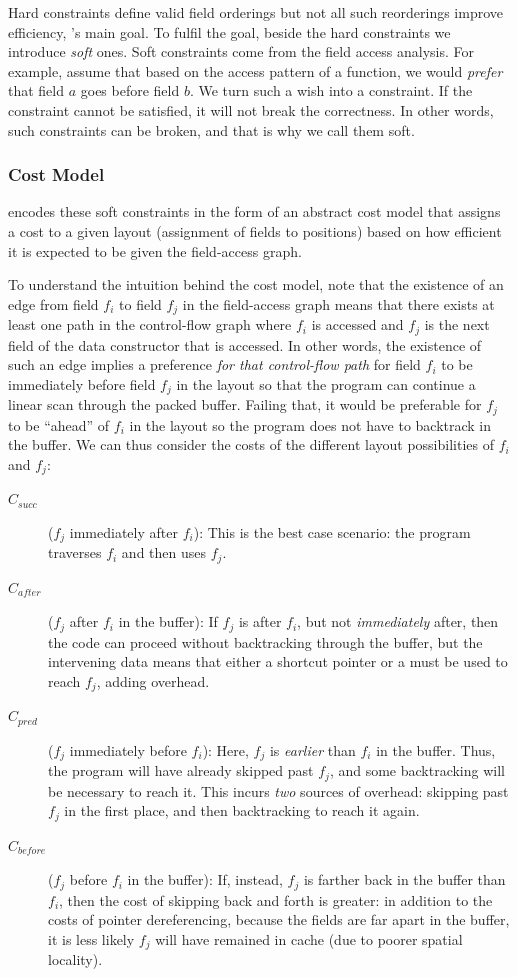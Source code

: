 Hard constraints define valid field orderings but not all such reorderings improve efficiency, \system's main goal.
%
To fulfil the goal, beside the hard constraints we introduce {\em soft} ones. Soft constraints come from the field access analysis. For example, assume that based on the access pattern of a function, we would {\em prefer} that field $a$ goes before field $b$. We turn such a wish into a constraint. If the constraint cannot be satisfied, it will not break the correctness. In other words, such constraints can be broken, and that is why we call them soft.

\subsubsection{Cost Model}
\system encodes these soft constraints in the form of an abstract cost model that assigns a cost to a given layout (assignment of fields to positions) based on how efficient it is expected to be given the field-access graph.

To understand the intuition behind the cost model, note that the existence of an edge from field $f_i$ to field $f_j$ in the field-access graph means that there exists at least one path in the control-flow graph where $f_i$ is accessed and $f_j$ is the next field of the data constructor that is accessed.
%
In other words, the existence of such an edge implies a preference {\em for that control-flow path} for field $f_i$ to be immediately before field $f_j$ in the layout so that the program can continue a linear scan through the packed buffer.
%
Failing that, it would be preferable for $f_j$ to be ``ahead'' of $f_i$ in the layout so the program does not have to backtrack in the buffer.
%
We can thus consider the costs of the different layout possibilities of $f_i$ and $f_j$:

\begin{description}
	\item[$C_{\mathit{succ}}$] ($f_j$ immediately after $f_i$): This is the best case scenario: the program traverses $f_i$ and then uses $f_j$.
	\item[$C_{\mathit{after}}$] ($f_j$ after $f_i$ in the buffer): If $f_j$ is after $f_i$, but not {\em immediately} after, then the code can proceed without backtracking through the buffer, but the intervening data means that either a shortcut pointer or a  must be used to reach $f_j$, adding overhead.
	\item[$C_{\mathit{pred}}$] ($f_j$ immediately before $f_i$): Here, $f_j$ is {\em earlier} than $f_i$ in the buffer. Thus, the program will have already skipped past $f_j$, and some backtracking will be necessary to reach it. This incurs {\em two} sources of overhead: skipping past $f_j$ in the first place, and then backtracking to reach it again.
	\item[$C_{\mathit{before}}$] ($f_j$ before $f_i$ in the buffer): If, instead, $f_j$ is farther back in the buffer than $f_i$, then the cost of skipping back and forth is greater: in addition to the costs of pointer dereferencing, because the fields are far apart in the buffer, it is less likely $f_j$ will have remained in cache (due to poorer spatial locality).
\end{description}

